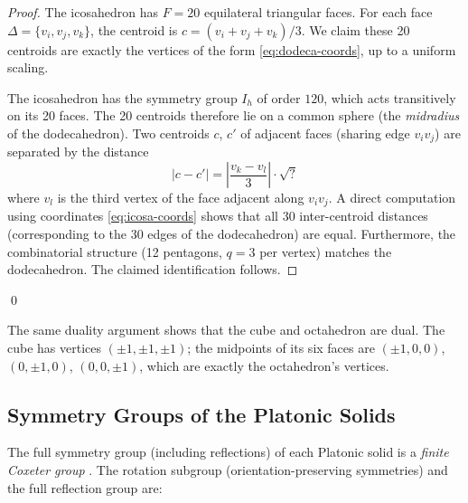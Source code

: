 \begin{proof}
The icosahedron has $F = 20$ equilateral triangular faces.  For each face
$\Delta = \{v_i, v_j, v_k\}$, the centroid is
$c = (v_i + v_j + v_k)/3$.  We claim these 20 centroids are exactly the
vertices of the form \eqref{eq:dodeca-coords}, up to a uniform scaling.

The icosahedron has the symmetry group $I_h$ of order $120$, which acts
transitively on its 20 faces.  The 20 centroids therefore lie on a common
sphere (the \emph{midradius} of the dodecahedron).  Two centroids $c$, $c'$
of adjacent faces (sharing edge $v_i v_j$) are separated by the distance
\[
  |c - c'| = \left|\frac{v_k - v_l}{3}\right| \cdot \sqrt{?}
\]
where $v_l$ is the third vertex of the face adjacent along $v_i v_j$.
A direct computation using coordinates \eqref{eq:icosa-coords} shows that
all 30 inter-centroid distances (corresponding to the 30 edges of the
dodecahedron) are equal.  Furthermore, the combinatorial structure (12
pentagons, $q = 3$ per vertex) matches the dodecahedron.  The claimed
identification follows.
\end{proof}
\qed

\begin{remark}
The same duality argument shows that the cube and octahedron are dual.
The cube has vertices $(\pm1,\pm1,\pm1)$; the midpoints of its six faces are
$(\pm1,0,0)$, $(0,\pm1,0)$, $(0,0,\pm1)$, which are exactly the octahedron's
vertices.
\end{remark}


\subsection{Symmetry Groups of the Platonic Solids}
\label{sec:symmetry-groups}

The full symmetry group (including reflections) of each Platonic solid is a
\emph{finite Coxeter group} \cite{coxeter_regular_polytopes}.  The rotation
subgroup (orientation-preserving symmetries) and the full reflection group are:

\begin{table}[ht]
\centering
\caption{Symmetry groups of the Platonic solids.}
\label{tab:symmetry-groups}
\end{table}

